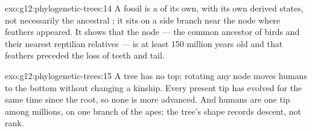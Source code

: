 \begin{solution}{exo:g12:phylogenetic-trees:14}
A fossil is a  of its own, with its own derived states, not
necessarily the ancestral ; it sits on a side branch near
the node where feathers appeared. It shows that the node --- the
common ancestor of birds and their nearest reptilian relatives --- is
at least 150 million years old and that feathers preceded the loss of
teeth and tail.
\end{solution}

\begin{solution}{exo:g12:phylogenetic-trees:15}
A tree has no top: rotating any node moves humans to the bottom
without changing a kinship. Every present tip has evolved for the same
time since the root, so none is more advanced. And humans are one tip
among millions, on one branch of the apes; the tree's shape records
descent, not rank.
\end{solution}

